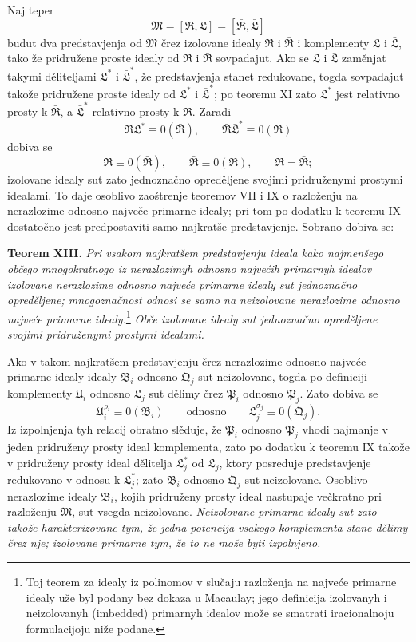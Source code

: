 \documentclass[11pt]{article}
\newcommand{\ideal}[1]{\mathfrak{#1}}
\begin{document}
Naj teper
\[
 \ideal M=[\ideal R,\ideal L]=[\bar{\ideal R},\bar{\ideal L}]
\]
budut dva predstavjenja od \(\ideal M\) črez izolovane idealy \(\ideal R\) i \(\bar{\ideal R}\) i komplementy \(\ideal L\) i \(\bar{\ideal L}\), tako že pridružene proste idealy od \(\ideal R\) i \(\bar{\ideal R}\) sovpadajut. Ako se \(\ideal L\) i \(\bar{\ideal L}\) zaměnjat takymi děliteljami \(\ideal L^*\) i \(\bar{\ideal L}^{*}\), že predstavjenja stanet redukovane, togda sovpadajut takože pridružene proste idealy od \(\ideal L^*\) i \(\bar{\ideal L}^{*}\); po teoremu XI zato \(\ideal L^*\) jest relativno prosty k \(\bar{\ideal R}\), a \(\bar{\ideal L}^{*}\) relativno prosty k \(\ideal R\). Zaradi
\[
 \ideal R\ideal L^*\equiv0(\bar{\ideal R}),
 \qquad
 \bar{\ideal R}\bar{\ideal L}^{*}\equiv0(\ideal R)
\]
dobiva se
\[
 \ideal R\equiv0(\bar{\ideal R}),
 \qquad
 \bar{\ideal R}\equiv0(\ideal R),
 \qquad
 \ideal R=\bar{\ideal R};
\]
izolovane idealy sut zato jednoznačno opreděljene svojimi pridruženymi prostymi idealami. To daje osoblivo zaoštrenje teoremov VII i IX o razloženju na nerazlozime odnosno največe primarne idealy; pri tom po dodatku k teoremu IX dostatočno jest predpostaviti samo najkratše predstavjenje. Sobrano dobiva se:

\textbf{Teorem XIII.} \emph{Pri vsakom najkratšem predstavjenju ideala kako najmenšego občego mnogokratnogo iz nerazlozimyh odnosno najvećih primarnyh idealov izolovane nerazlozime odnosno najveće primarne idealy sut jednoznačno opreděljene; mnogoznačnost odnosi se samo na neizolovane nerazlozime odnosno najveće primarne idealy.}\footnote{Toj teorem za idealy iz polinomov v slučaju razloženja na najveće primarne idealy uže byl podany bez dokaza u Macaulay; jego definicija izolovanyh i neizolovanyh (imbedded) primarnyh idealov može se smatrati iracionalnoju formulacijoju niže podane.} \emph{Obče izolovane idealy sut jednoznačno opreděljene svojimi pridruženymi prostymi idealami.}

Ako v takom najkratšem predstavjenju črez nerazlozime odnosno najveće primarne idealy idealy \(\ideal B_i\) odnosno \(\ideal Q_j\) sut neizolovane, togda po definiciji komplementy \(\ideal U_i\) odnosno \(\ideal L_j\) sut dělimy črez \(\ideal P_i\) odnosno \(\ideal P_j\). Zato dobiva se
\[
 \ideal U_i^{\varrho_i}\equiv0(\ideal B_i)
 \qquad \text{odnosno} \qquad
 \ideal L_j^{\sigma_j}\equiv0(\ideal Q_j).
\]
Iz izpolnjenja tyh relacij obratno slěduje, že \(\ideal P_i\) odnosno \(\ideal P_j\) vhodi najmanje v jeden pridruženy prosty ideal komplementa, zato po dodatku k teoremu IX takože v pridruženy prosty ideal dělitelja \(\ideal L_j^*\) od \(\ideal L_j\), ktory posreduje predstavjenje redukovano v odnosu k \(\ideal L_j^*\); zato \(\ideal B_i\) odnosno \(\ideal Q_j\) sut neizolovane. Osoblivo nerazlozime idealy \(\ideal B_i\), kojih pridruženy prosty ideal nastupaje večkratno pri razloženju \(\ideal M\), sut vsegda neizolovane. \emph{Neizolovane primarne idealy sut zato takože harakterizovane tym, že jedna potencija vsakogo komplementa stane dělimy črez nje; izolovane primarne tym, že to ne može byti izpolnjeno.}
\end{document}
